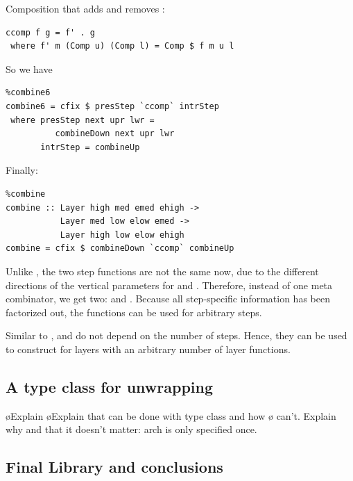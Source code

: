 \documentclass[preprint,natbib]{sigplanconf}
\begin{document}
Composition that adds and removes :
\begin{small}
\begin{verbatim}
ccomp f g = f' . g
 where f' m (Comp u) (Comp l) = Comp $ f m u l
\end{verbatim}%
\end{small}

So we have

\begin{small}
\begin{verbatim}%combine6
combine6 = cfix $ presStep `ccomp` intrStep
 where presStep next upr lwr =  
          combineDown next upr lwr  
       intrStep = combineUp
\end{verbatim}%
\end{small}

Finally:

\begin{small}
\begin{verbatim}%combine
combine :: Layer high med emed ehigh ->
           Layer med low elow emed -> 
           Layer high low elow ehigh
combine = cfix $ combineDown `ccomp` combineUp
\end{verbatim}%
\end{small}


Unlike , the two step functions are not the same now, due to the different directions of the vertical parameters for  and . Therefore, instead of one meta combinator, we get two:  and . Because all step-specific information has been factorized out, the functions can be used for arbitrary steps.



Similar to ,  and  do not depend on the number of steps. Hence, they can be used to construct  for layers with an arbitrary number of layer functions.
%																
\subsection{A type class for unwrapping}

\bl
\o Explain 
\o Explain that  can be done with type class and how
\o {} can't. Explain why and that it doesn't matter: arch is only specified once.
\el

%																
\subsection{Final Library and conclusions} \label{sect:libAndConclusions}
\end{document}
